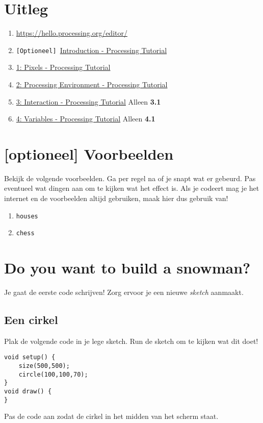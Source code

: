 \section{Uitleg}
\begin{enumerate}
	\item \href{https://hello.processing.org/editor/}{https://hello.processing.org/editor/}
	\item \texttt{[Optioneel] }\href{https://www.youtube.com/watch?v=2VLaIr5Ckbs\&list=PLRqwX-V7Uu6ZYJC7L-r6rX6utt6wwJCyi}{Introduction - Processing Tutorial}
	\item \href{https://www.youtube.com/watch?v=a562vsSI2Po&list=PLRqwX-V7Uu6bsRnSEJ9tRn4V_XCGXovs4}{1: Pixels - Processing Tutorial}
	\item \href{https://www.youtube.com/watch?v=5N31KNgOO0g&list=PLRqwX-V7Uu6Yo4VdQ4ZTtqRQ1AE4t_Ep9}{2: Processing Environment - Processing Tutorial}
	\item \href{https://www.youtube.com/watch?v=o8dffrZ86gs&list=PLRqwX-V7Uu6by61pbhdvyEpIeymlmnXzD}{3: Interaction - Processing Tutorial} Alleen \textbf{3.1}
	\item \href{https://www.youtube.com/watch?v=B-ycSR3ntik&list=PLRqwX-V7Uu6aFNOgoIMSbSYOkKNTo89uf}{4: Variables - Processing Tutorial} Alleen \textbf{4.1}
\end{enumerate}


\section{[optioneel] Voorbeelden}
Bekijk de volgende voorbeelden. Ga per regel na of je snapt wat er gebeurd. Pas eventueel wat dingen aan om te kijken wat het effect is. Als je codeert mag je het internet en de voorbeelden altijd gebruiken, maak hier dus gebruik van!
\begin{enumerate}
	\item \texttt{houses}
	\item \texttt{chess}
\end{enumerate}

\section{Do you want to build a snowman?}
Je gaat de eerste code schrijven! Zorg ervoor je een nieuwe \textit{sketch} aanmaakt.
\subsection{Een cirkel}
Plak de volgende code in je lege sketch. Run de sketch om te kijken wat dit doet!
\begin{lstlisting}
void setup() {
    size(500,500);
    circle(100,100,70);
}
void draw() {
}
\end{lstlisting}
Pas de code aan zodat de cirkel in het midden van het scherm staat.
